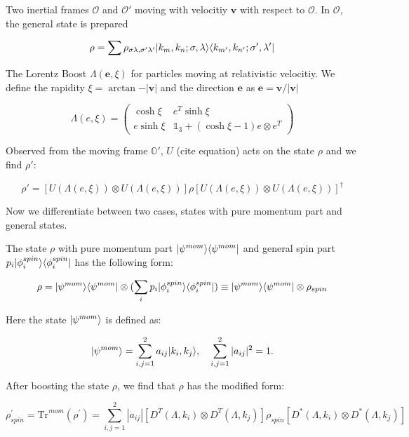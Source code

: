 Two inertial frames $\mathcal{O}$ and $\mathcal{O'}$ moving with velocitiy $\textbf{v}$ with respect to $\mathcal{O}$. In $\mathcal{O}$, the general state is prepared

\begin{equation}
    \rho = \sum \rho_{\sigma \lambda, \sigma' \lambda'} \lvert k_m, k_n ; \sigma, \lambda\rangle \langle k_{m'}, k_{n'} ; \sigma', \lambda'\rvert
\end{equation}

The Lorentz Boost $\Lambda(\textbf{e},\xi)$ for particles moving at relativistic velocitiy. We define the rapidity $\xi = \arctan{-|\textbf{v}|}$ and the direction $\textbf{e}$ as $ \textbf{e} = \textbf{v}/|\textbf{v}|$

\begin{equation}
    \Lambda(e, \xi) =
    \begin{pmatrix}
        \cosh \xi & e^T \sinh \xi \\
        e \sinh \xi & \mathds{1}_3 + (\cosh \xi - 1) e \otimes e^T
    \end{pmatrix}
\end{equation}

Observed from the moving frame $\mathds{O'}$, $U$ (cite equation) acts on the state $\rho$ and we find $\rho'$:

\begin{equation}
    \rho' = \left[ U(\Lambda(e, \xi)) \otimes U(\Lambda(e, \xi)) \right] \rho \left[ U(\Lambda(e, \xi)) \otimes U(\Lambda(e, \xi)) \right]^\dagger
\end{equation}

Now we differentiate between two cases, states with pure momentum part and general states.

The state $\rho$ with pure momentum part $\lvert\psi^{mom}\rangle\langle\psi^{mom}\rvert$ and general spin part $p_i\lvert\phi_i^{spin}\rangle\langle\phi_i^{spin}\rvert$ has the following form: 

\begin{equation}
    \rho = \lvert\psi^{mom}\rangle\langle\psi^{mom}\rvert \otimes (\sum_{i} p_i\lvert\phi_i^{spin}\rangle\langle\phi_i^{spin}\rvert) \equiv \lvert\psi^{mom}\rangle\langle\psi^{mom}\rvert \otimes \rho_{spin}
\end{equation}

Here the state $\lvert\psi^{mom}\rangle$ is defined as:

\begin{equation}
    \lvert\psi^{mom}\rangle = \sum_{i,j=1}^{2}a_{ij}\lvert k_i,k_j\rangle, \quad \sum_{i,j=1}^{2}|a_{ij}|^2 = 1.
\end{equation}

After boosting the state $\rho$, we find that $\rho$ has the modified form:

\begin{equation}
    \rho^\prime_{spin} = \text{Tr}^{mom}(\rho^\prime) = \sum_{i,j=1}^{2}|a_{ij}|[D^T(\Lambda,k_i) \otimes D^T(\Lambda,k_j)]\rho_{spin}[D^*(\Lambda,k_i) \otimes D^*(\Lambda,k_j)]
\end{equation}